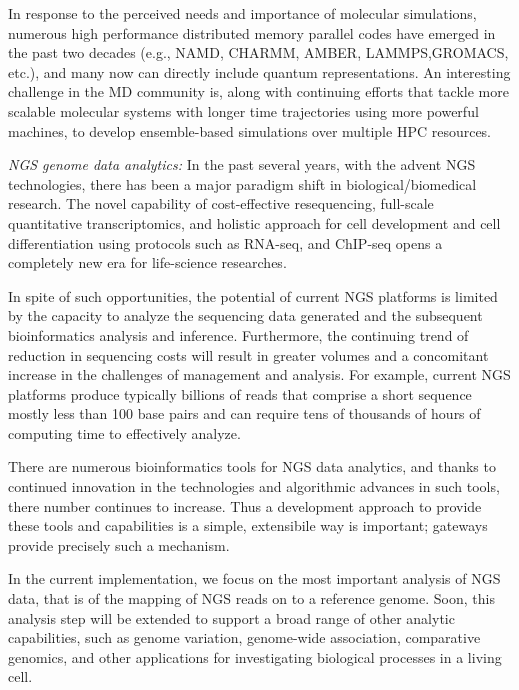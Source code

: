 \documentclass[]{article}
\begin{document}
In response to the perceived needs and importance of molecular
simulations, numerous high performance distributed memory parallel
codes have emerged in the past two decades (e.g., NAMD, CHARMM,
AMBER, LAMMPS,GROMACS, etc.), and many now can directly include
quantum representations.  An interesting challenge in the MD community
is, along with continuing efforts that tackle more scalable molecular
systems with longer time trajectories using more powerful machines, to
develop ensemble-based simulations over multiple HPC resources.

\textit{NGS genome data analytics:} In the past several years, with
the advent NGS technologies\cite{mardis2008-tig,metzker2010}, there
has been a major paradigm shift in biological/biomedical research.
The novel capability of cost-effective resequencing, full-scale
quantitative transcriptomics, and holistic approach for cell
development and cell differentiation using protocols such as RNA-seq,
and ChIP-seq opens a completely new era for life-science
researches\cite{sorek2010}.  

In spite of such opportunities, the potential of current NGS platforms
is limited by the capacity to analyze the sequencing data generated
and the subsequent bioinformatics analysis and inference. Furthermore,
the continuing trend of reduction in sequencing costs will result in
greater volumes and a concomitant increase in the challenges of
management and analysis.  For example, current NGS platforms produce
typically billions of reads that comprise a short sequence mostly less
than 100 base pairs\cite{alex2009} and can require tens of thousands
of hours of computing time to effectively analyze.


There are numerous bioinformatics tools for NGS data analytics, and
thanks to continued innovation in the technologies and algorithmic
advances in such tools, there number continues to increase.  Thus a
development approach to provide these tools and capabilities is a
simple, extensibile way is important; gateways provide precisely such
a mechanism.

In the current implementation, we focus on the most important analysis
of NGS data, that is of the mapping of NGS reads on to a reference
genome.  Soon, this analysis step will be extended to support a broad
range of other analytic capabilities, such as genome variation,
genome-wide association, comparative genomics, and other applications
for investigating biological processes in a living cell.
\end{document}
